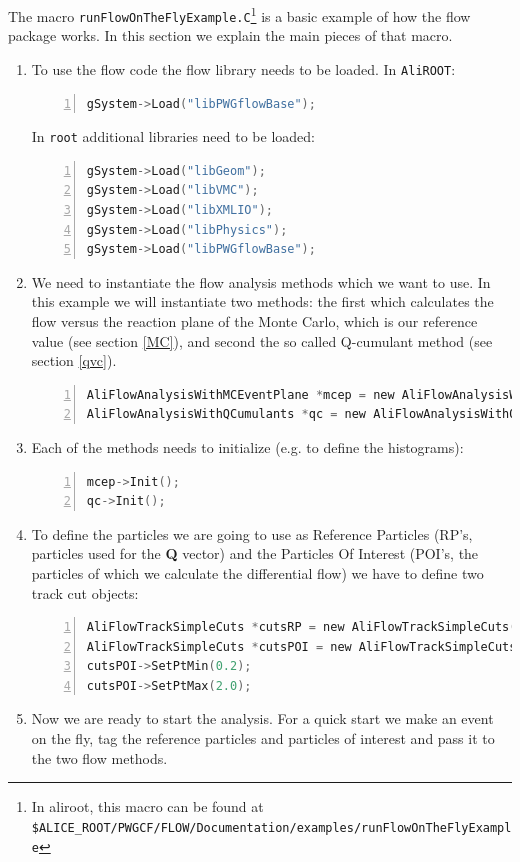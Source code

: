 \documentclass[a4paper]{book}
\numberwithin{equation}{subsection}
\begin{document}
The macro \texttt{runFlowOnTheFlyExample.C}\footnote{In aliroot, this macro can be found at \\ \texttt{\$ALICE\_ROOT/PWGCF/FLOW/Documentation/examples/runFlowOnTheFlyExample}} is a basic example of how the flow package works. 
In this section we explain the main pieces of that macro.
\begin{enumerate}
	\item To use the flow code the flow library needs to be loaded. In \texttt{AliROOT}:
	\begin{lstlisting}[language=C, numbers=left]
gSystem->Load("libPWGflowBase");\end{lstlisting}
	In \texttt{root} additional libraries need to be loaded: 
        \begin{lstlisting}[language=C, numbers=left]
gSystem->Load("libGeom");
gSystem->Load("libVMC");
gSystem->Load("libXMLIO");
gSystem->Load("libPhysics");
gSystem->Load("libPWGflowBase");\end{lstlisting}
	\item We need to instantiate the flow analysis methods which we want to use. In this example we will
	instantiate two methods: the first which calculates the flow versus the reaction plane of the Monte Carlo, which is our reference value (see section \ref{MC}), and second the so called Q-cumulant method (see section \ref{qvc}).
\begin{lstlisting}[language=C, numbers=left]
AliFlowAnalysisWithMCEventPlane *mcep = new AliFlowAnalysisWithMCEventPlane();
AliFlowAnalysisWithQCumulants *qc = new AliFlowAnalysisWithQCumulants();\end{lstlisting}
	\item Each of the methods needs to initialize (e.g. to define the histograms): 
\begin{lstlisting}[language=C, numbers=left]
mcep->Init(); 
qc->Init();\end{lstlisting}
	\item To define the particles we are going to use as Reference Particles  (RP's, particles 
	used for the {\bf Q} vector) and the Particles Of Interest  (POI's, the particles of which 
	we calculate the differential flow) we have to define two track cut objects:
	\begin{lstlisting}[language=C, numbers=left]
AliFlowTrackSimpleCuts *cutsRP = new AliFlowTrackSimpleCuts();
AliFlowTrackSimpleCuts *cutsPOI = new AliFlowTrackSimpleCuts();
cutsPOI->SetPtMin(0.2);
cutsPOI->SetPtMax(2.0);	\end{lstlisting}
	\item Now we are ready to start the analysis. For a quick start we make an event on the fly, tag the reference particles and particles of interest  and pass it to the two flow methods. 
	

\end{enumerate}
\end{document}
